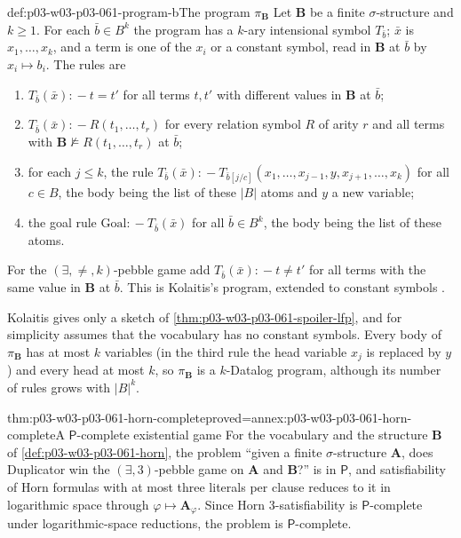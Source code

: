 \begin{hbdefinition}{def:p03-w03-p03-061-program-b}{The program \(\pi_{\mathbf B}\)}
Let \(\mathbf B\) be a finite \(\sigma\)-structure and \(k\ge1\). For each
\(\bar b\in B^k\) the program has a \(k\)-ary intensional symbol
\(T_{\bar b}\); \(\bar x\) is \(x_1,\ldots,x_k\), and a term is one of the
\(x_i\) or a constant symbol, read in \(\mathbf B\) at \(\bar b\) by
\(x_i\mapsto b_i\). The rules are
\begin{enumerate}
\item \(T_{\bar b}(\bar x)\mathrel{{:}\!-}t=t'\) for all terms \(t,t'\) with
      different values in \(\mathbf B\) at \(\bar b\);
\item \(T_{\bar b}(\bar x)\mathrel{{:}\!-}R(t_1,\ldots,t_r)\) for every
      relation symbol \(R\) of arity \(r\) and all terms with
      \(\mathbf B\not\models R(t_1,\ldots,t_r)\) at \(\bar b\);
\item for each \(j\le k\), the rule
      \(T_{\bar b}(\bar x)\mathrel{{:}\!-}T_{\bar b[j/c]}(x_1,\ldots,x_{j-1},y,
      x_{j+1},\ldots,x_k)\) for all \(c\in B\), the body being the list of
      these \(|B|\) atoms and \(y\) a new variable;
\item the goal rule \(\mathrm{Goal}\mathrel{{:}\!-}T_{\bar b}(\bar x)\) for
      all \(\bar b\in B^k\), the body being the list of these atoms.
\end{enumerate}
For the \((\exists,\neq,k)\)-pebble game add
\(T_{\bar b}(\bar x)\mathrel{{:}\!-}t\neq t'\) for all terms with the same
value in \(\mathbf B\) at \(\bar b\). This is Kolaitis's program, extended to
constant symbols \cite[pp.~74--75]{Kolaitis2003ExpressivePowerNotes}.
\end{hbdefinition}

Kolaitis gives only a sketch of \cref{thm:p03-w03-p03-061-spoiler-lfp}, and
for simplicity assumes that the vocabulary has no constant symbols. Every
body of \(\pi_{\mathbf B}\) has at most \(k\) variables (in the third rule the
head variable \(x_j\) is replaced by \(y\)) and every head at most \(k\), so
\(\pi_{\mathbf B}\) is a \(k\)-Datalog program, although its number of rules
grows with \(|B|^k\).

\begin{hbtheorem}{thm:p03-w03-p03-061-horn-complete}{proved=annex:p03-w03-p03-061-horn-complete}{A \(\mathsf P\)-complete existential game}
For the vocabulary and the structure \(\mathbf B\) of
\cref{def:p03-w03-p03-061-horn}, the problem ``given a finite
\(\sigma\)-structure \(\mathbf A\), does Duplicator win the
\((\exists,3)\)-pebble game on \(\mathbf A\) and \(\mathbf B\)?'' is in
\(\mathsf P\), and satisfiability of Horn formulas with at most three
literals per clause reduces to it in logarithmic space through
\(\varphi\mapsto\mathbf A_\varphi\). Since Horn 3-satisfiability is
\(\mathsf P\)-complete under logarithmic-space reductions, the problem is
\(\mathsf P\)-complete.
\end{hbtheorem}

